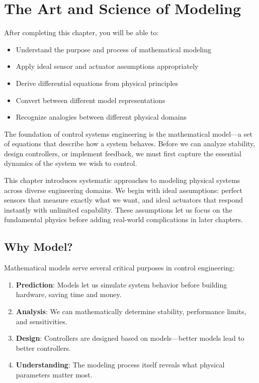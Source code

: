 
\chapter{The Art and Science of Modeling}
\label{ch:modeling_philosophy}

\begin{keyconceptbox}[title=Learning Objectives]
After completing this chapter, you will be able to:
\begin{itemize}
    \item Understand the purpose and process of mathematical modeling
    \item Apply ideal sensor and actuator assumptions appropriately
    \item Derive differential equations from physical principles
    \item Convert between different model representations
    \item Recognize analogies between different physical domains
\end{itemize}
\end{keyconceptbox}

The foundation of control systems engineering is the mathematical model---a set of equations that describe how a system behaves. Before we can analyze stability, design controllers, or implement feedback, we must first capture the essential dynamics of the system we wish to control.

This chapter introduces systematic approaches to modeling physical systems across diverse engineering domains. We begin with ideal assumptions: perfect sensors that measure exactly what we want, and ideal actuators that respond instantly with unlimited capability. These assumptions let us focus on the fundamental physics before adding real-world complications in later chapters.

\section{Why Model?}

Mathematical models serve several critical purposes in control engineering:

\begin{enumerate}
    \item \textbf{Prediction}: Models let us simulate system behavior before building hardware, saving time and money.

    \item \textbf{Analysis}: We can mathematically determine stability, performance limits, and sensitivities.

    \item \textbf{Design}: Controllers are designed based on models---better models lead to better controllers.

    \item \textbf{Understanding}: The modeling process itself reveals what physical parameters matter most.
\end{enumerate}

